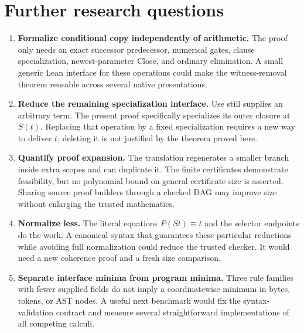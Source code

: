 \documentclass[11pt,letterpaper]{article}
\theoremstyle{definition}\newtheorem{definition}[theorem]{Definition}
\theoremstyle{remark}\newtheorem{remark}[theorem]{Remark}
\begin{document}
\section{Further research questions}
\begin{enumerate}
\item \textbf{Formalize conditional copy independently of arithmetic.}
The proof only needs an exact successor predecessor, numerical gates,
clause specialization, newest-parameter Close, and ordinary elimination.
A small generic Lean interface for these operations could make the
witness-removal theorem reusable across several native presentations.
\item \textbf{Reduce the remaining specialization interface.}
Use still supplies an arbitrary term. The present proof specifically
specializes its outer closure at $S(t)$. Replacing that operation by a
fixed specialization requires a new way to deliver $t$; deleting it is
not justified by the theorem proved here.
\item \textbf{Quantify proof expansion.}
The translation regenerates a smaller branch inside extra scopes and
can duplicate it. The finite certificates demonstrate feasibility,
but no polynomial bound on general certificate size is asserted.
Sharing source proof builders through a checked DAG may improve size
without enlarging the trusted mathematics.
\item \textbf{Normalize less.}
The literal equations $P(St)\equiv t$ and the selector endpoints do the
work. A canonical syntax that guarantees these particular reductions
while avoiding full normalization could reduce the trusted checker.
It would need a new coherence proof and a fresh size comparison.
\item \textbf{Separate interface minima from program minima.}
Three rule families with fewer supplied fields do not imply a
coordinatewise minimum in bytes, tokens, or AST nodes. A useful next
benchmark would fix the syntax-validation contract and measure several
straightforward implementations of all competing calculi.
\end{enumerate}

\appendix
\end{document}
